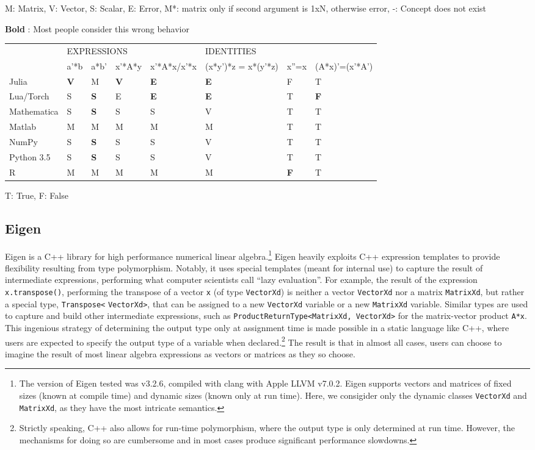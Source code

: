 M: Matrix, V: Vector, S: Scalar, E: Error, M{*}: matrix only if second
argument is 1xN, otherwise error, -: Concept does not exist

\textbf{Bold} : Most people consider this wrong behavior

\begin{tabular}{|l|l|l|l|l|l|l|l|}
\cline{2-8}
\multicolumn{1}{l|}{} & \multicolumn{4}{l|}{EXPRESSIONS} & \multicolumn{3}{l|}{IDENTITIES}\tabularnewline
\cline{2-8}
\multicolumn{1}{l|}{} & a'{*}b & a{*}b' & x'{*}A{*}y & x'{*}A{*}x/x'{*}x & (x{*}y'){*}z = x{*}(y'{*}z) & x''=x & (A{*}x)'=(x'{*}A')\tabularnewline
\hline
Julia & \textbf{V} & M & \textbf{V} & \textbf{E} & \textbf{E} & F & T\tabularnewline
\hline
Lua/Torch & S & \textbf{S} & E & \textbf{E} & \textbf{E} & T & \textbf{F}\tabularnewline
\hline
Mathematica & S & \textbf{S} & S & S & V & T & T\tabularnewline
\hline
Matlab & M & M & M & M & M & T & T\tabularnewline
\hline
NumPy & S & \textbf{S} & S & S & V & T & T\tabularnewline
\hline
Python 3.5 & S & \textbf{S} & S & S & V & T & T\tabularnewline
\hline
R & M & M & M & M & M & \textbf{F} & T\tabularnewline
\hline
\end{tabular}

T: True, F: False


\subsection{Eigen}

Eigen is a C++ library for high performance numerical linear algebra.\cite{eigenweb}\footnote{The version of Eigen tested was v3.2.6, compiled with clang with Apple LLVM v7.0.2.
Eigen supports vectors and matrices of fixed sizes (known at compile time) and dynamic sizes (known only at run time). Here, we consigider only the dynamic classes \verb|VectorXd| and \verb|MatrixXd|, as they have the most intricate semantics.}
Eigen heavily exploits C++ expression templates to provide flexibility resulting from type polymorphism. Notably, it uses special templates (meant for internal use) to capture the result of intermediate expressions, performing what computer scientists call ``lazy evaluation''. For example, the result of the expression \verb|x.transpose()|, performing the transpose of a vector \verb|x| (of type \verb|VectorXd|) is neither a vector \verb|VectorXd| nor a matrix \verb|MatrixXd|, but rather a special type, \verb|Transpose<| \verb|VectorXd>|, that can be assigned to a new \verb|VectorXd| variable or a new \verb|MatrixXd| variable. Similar types are used to capture and build other intermediate expressions, such as \verb|ProductReturnType<MatrixXd, VectorXd>| for the matrix-vector product \verb|A*x|.
This ingenious strategy of determining the output type only at assignment time is made possible in a static language like C++, where users are expected to specify the output type of a variable when declared.\footnote{Strictly speaking, C++ also allows for run-time polymorphism, where the output type is only determined at run time. However, the mechanisms for doing so are cumbersome and in most cases produce significant performance slowdowns.} The result is that in almost all cases, users can choose to imagine the result of most linear algebra expressions as vectors or matrices as they so choose.

